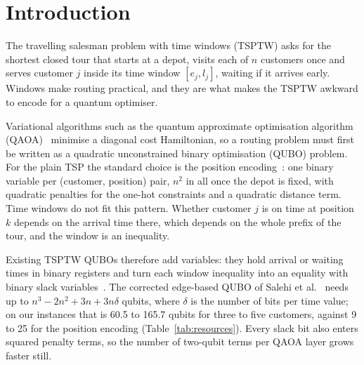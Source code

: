 \section{Introduction}\label{sec:intro}

The travelling salesman problem with time windows (TSPTW) asks for the shortest closed tour
that starts at a depot, visits each of $n$ customers once and serves customer $j$ inside its
time window $[e_j,l_j]$, waiting if it arrives early. Windows make routing practical, and
they are what makes the TSPTW awkward to encode for a quantum optimiser.

Variational algorithms such as the quantum approximate optimisation algorithm
(QAOA)~\cite{farhi2014qaoa,hadfield2019qaoa} minimise a diagonal cost Hamiltonian, so a
routing problem must first be written as a quadratic unconstrained binary optimisation (QUBO)
problem. For the plain TSP the standard choice is the position encoding~\cite{lucas2014ising}:
one binary variable per (customer, position) pair, $n^2$ in all once the depot is fixed, with
quadratic penalties for the one-hot constraints and a quadratic distance term. Time windows do
not fit this pattern. Whether customer $j$ is on time at position $k$ depends on the arrival
time there, which depends on the whole prefix of the tour, and the window is an inequality.

Existing TSPTW QUBOs therefore add variables: they hold arrival or waiting times in binary
registers and turn each window inequality into an equality with binary slack
variables~\cite{papalitsas2019qubo,salehi2022unconstrained}. The corrected edge-based QUBO of
Salehi et al.~\cite{salehi2022unconstrained} needs up to $n^3-2n^2+3n+3n\delta$ qubits, where
$\delta$ is the number of bits per time value; on our instances that is 60.5 to 165.7 qubits
for three to five customers, against 9 to 25 for the position encoding
(Table~\ref{tab:resources}). Every slack bit also enters squared penalty terms, so the number
of two-qubit terms per QAOA layer grows faster still.

